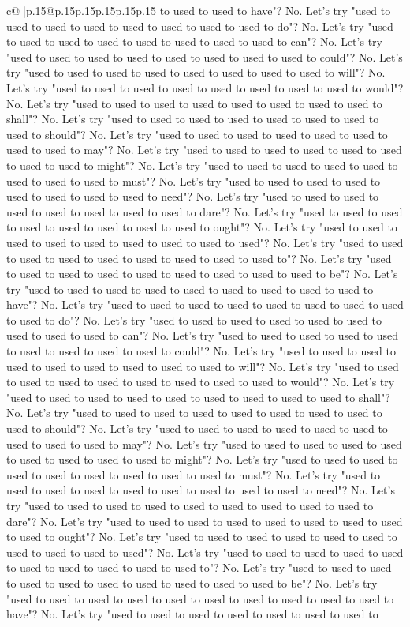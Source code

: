 \documentclass{article}
\begin{document}
{\begin{supertabular}{c@{$\;$}|p{.15\linewidth}@{}p{.15\linewidth}p{.15\linewidth}p{.15\linewidth}p{.15\linewidth}p{.15\linewidth}}
{{{to used to used to have"? No. Let's try "used to used to used to used to used to used to used to used to do"? No. Let's try "used to used to used to used to used to used to used to used to can"? No. Let's try "used to used to used to used to used to used to used to used to could"? No. Let's try "used to used to used to used to used to used to used to used to will"? No. Let's try "used to used to used to used to used to used to used to used to would"? No. Let's try "used to used to used to used to used to used to used to used to shall"? No. Let's try "used to used to used to used to used to used to used to used to should"? No. Let's try "used to used to used to used to used to used to used to used to may"? No. Let's try "used to used to used to used to used to used to used to used to might"? No. Let's try "used to used to used to used to used to used to used to used to must"? No. Let's try "used to used to used to used to used to used to used to used to need"? No. Let's try "used to used to used to used to used to used to used to used to dare"? No. Let's try "used to used to used to used to used to used to used to used to ought"? No. Let's try "used to used to used to used to used to used to used to used to used"? No. Let's try "used to used to used to used to used to used to used to used to used to"? No. Let's try "used to used to used to used to used to used to used to used to used to be"? No. Let's try "used to used to used to used to used to used to used to used to used to have"? No. Let's try "used to used to used to used to used to used to used to used to used to do"? No. Let's try "used to used to used to used to used to used to used to used to used to can"? No. Let's try "used to used to used to used to used to used to used to used to used to could"? No. Let's try "used to used to used to used to used to used to used to used to used to will"? No. Let's try "used to used to used to used to used to used to used to used to used to would"? No. Let's try "used to used to used to used to used to used to used to used to used to shall"? No. Let's try "used to used to used to used to used to used to used to used to used to should"? No. Let's try "used to used to used to used to used to used to used to used to used to may"? No. Let's try "used to used to used to used to used to used to used to used to used to might"? No. Let's try "used to used to used to used to used to used to used to used to used to must"? No. Let's try "used to used to used to used to used to used to used to used to used to need"? No. Let's try "used to used to used to used to used to used to used to used to used to dare"? No. Let's try "used to used to used to used to used to used to used to used to used to ought"? No. Let's try "used to used to used to used to used to used to used to used to used to used"? No. Let's try "used to used to used to used to used to used to used to used to used to used to"? No. Let's try "used to used to used to used to used to used to used to used to used to used to be"? No. Let's try "used to used to used to used to used to used to used to used to used to used to have"? No. Let's try "used to used to used to used to used to used to used to }}}
\end{supertabular}}
\end{document}
